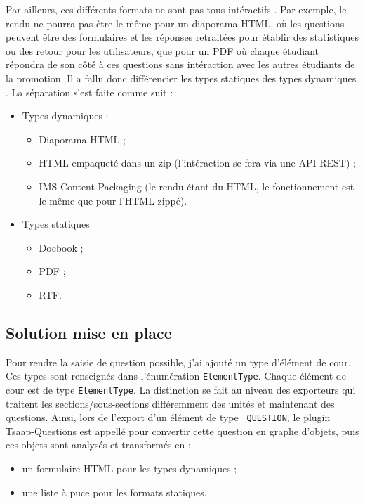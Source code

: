 Par ailleurs, ces différents formats ne sont pas tous \og intéractifs \fg{}. Par
exemple, le rendu ne pourra pas être le même pour un diaporama HTML, où les
questions peuvent être des formulaires et les réponses retraitées pour établir
des statistiques ou des retour pour les utilisateurs, que pour un PDF où chaque
étudiant répondra de son côté à ces questions sans intéraction avec les autres
étudiants de la promotion. Il a fallu donc différencier les types \og statiques
\fg{} des types \og dynamiques \fg{}. La séparation s'est faite comme suit :
\begin{itemize}
  \item Types dynamiques :
	\begin{itemize}
	  \item Diaporama HTML ;
	  \item HTML empaqueté dans un zip (l'intéraction se fera via une API REST) ;
	  \item IMS Content Packaging (le rendu étant du HTML, le fonctionnement est
		le même que pour l'HTML zippé).
	\end{itemize}
  \item Types statiques 
	\begin{itemize}
	  \item Docbook ;
	  \item PDF ;
	  \item RTF.
	\end{itemize}
\end{itemize}

\subsection{Solution mise en place}
Pour rendre la saisie de question possible, j'ai ajouté un type d'élément de
cour. Ces types sont renseignés dans l'énumération {\tt ElementType}. Chaque
élément de cour est de type {\tt ElementType}. La distinction se fait au niveau
des exporteurs qui traitent les sections/sous-sections différemment des unités
et maintenant des questions. Ainsi, lors de l'export d'un élément de type {\tt
QUESTION}, le plugin Tsaap-Questions est appellé pour convertir cette question
en graphe d'objets, puis ces objets sont analysés et transformés en :
\begin{itemize}
  \item un formulaire HTML pour les types dynamiques ;
  \item une liste à puce pour les formats statiques.
\end{itemize}



